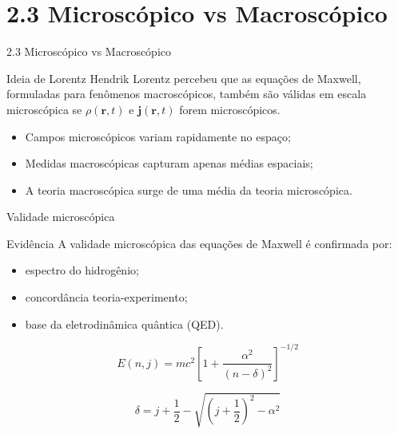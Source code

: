 \documentclass[aspectratio=169]{beamer}
\begin{document}

\section{2.3 Microscópico vs Macroscópico}

\begin{frame}{2.3 Microscópico vs Macroscópico}
\small

\begin{block}{Ideia de Lorentz}
Hendrik Lorentz percebeu que as equações de Maxwell, formuladas para fenômenos macroscópicos, também são válidas em escala microscópica se \(\rho(\mathbf{r},t)\) e \(\mathbf{j}(\mathbf{r},t)\) forem microscópicos.
\end{block}

\vspace{0.1cm}

\begin{itemize}\setlength{\itemsep}{2pt}
\item Campos microscópicos variam rapidamente no espaço;
\item Medidas macroscópicas capturam apenas médias espaciais;
\item A teoria macroscópica surge de uma média da teoria microscópica.
\end{itemize}

\end{frame}

\begin{frame}{Validade microscópica}
\footnotesize

\begin{block}{Evidência}
A validade microscópica das equações de Maxwell é confirmada por:
\begin{itemize}\setlength{\itemsep}{2pt}
\item espectro do hidrogênio;
\item concordância teoria-experimento;
\item base da eletrodinâmica quântica (QED).
\end{itemize}
\end{block}

\vspace{0.1cm}

\begin{equation}
E(n,j)=mc^2\left[1+\frac{\alpha^2}{(n-\delta)^2}\right]^{-1/2}
\tag{2.36}
\end{equation}

\begin{equation*}
\delta = j+\frac{1}{2}-\sqrt{\left(j+\frac{1}{2}\right)^2-\alpha^2}
\end{equation*}

\end{frame}
\end{document}
